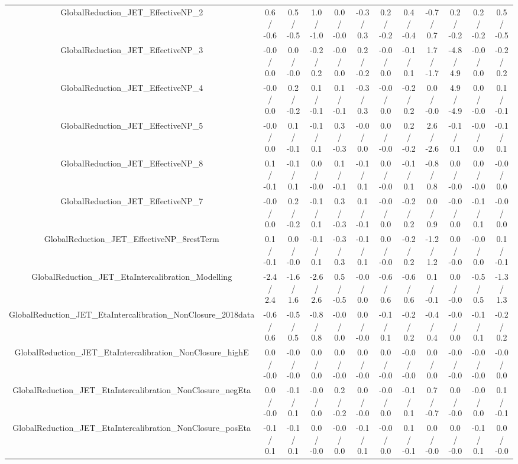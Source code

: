 \begin{table}[htbp]
\begin{center}
\begin{tabular}{|c|c|c|c|c|c|c|c|c|c|c|c|}
  GlobalReduction_JET_EffectiveNP_2 & 0.6 / -0.6 & 0.5 / -0.5 & 1.0 / -1.0 & 0.0 / -0.0 & -0.3 / 0.3 & 0.2 / -0.2 & 0.4 / -0.4 & -0.7 / 0.7 & 0.2 / -0.2 & 0.2 / -0.2 & 0.5 / -0.5 \\ 
  GlobalReduction_JET_EffectiveNP_3 & -0.0 / 0.0 & 0.0 / -0.0 & -0.2 / 0.2 & -0.0 / 0.0 & 0.2 / -0.2 & -0.0 / 0.0 & -0.1 / 0.1 & 1.7 / -1.7 & -4.8 / 4.9 & -0.0 / 0.0 & -0.2 / 0.2 \\ 
  GlobalReduction_JET_EffectiveNP_4 & -0.0 / 0.0 & 0.2 / -0.2 & 0.1 / -0.1 & 0.1 / -0.1 & -0.3 / 0.3 & -0.0 / 0.0 & -0.2 / 0.2 & 0.0 / -0.0 & 4.9 / -4.9 & 0.0 / -0.0 & 0.1 / -0.1 \\ 
  GlobalReduction_JET_EffectiveNP_5 & -0.0 / 0.0 & 0.1 / -0.1 & -0.1 / 0.1 & 0.3 / -0.3 & -0.0 / 0.0 & 0.0 / -0.0 & 0.2 / -0.2 & 2.6 / -2.6 & -0.1 / 0.1 & -0.0 / 0.0 & -0.1 / 0.1 \\ 
  GlobalReduction_JET_EffectiveNP_8 & 0.1 / -0.1 & -0.1 / 0.1 & 0.0 / -0.0 & 0.1 / -0.1 & -0.1 / 0.1 & 0.0 / -0.0 & -0.1 / 0.1 & -0.8 / 0.8 & 0.0 / -0.0 & 0.0 / -0.0 & -0.0 / 0.0 \\ 
  GlobalReduction_JET_EffectiveNP_7 & -0.0 / 0.0 & 0.2 / -0.2 & -0.1 / 0.1 & 0.3 / -0.3 & 0.1 / -0.1 & -0.0 / 0.0 & -0.2 / 0.2 & 0.0 / 0.9 & -0.0 / 0.0 & -0.1 / 0.1 & -0.0 / 0.0 \\ 
  GlobalReduction_JET_EffectiveNP_8restTerm & 0.1 / -0.1 & 0.0 / -0.0 & -0.1 / 0.1 & -0.3 / 0.3 & -0.1 / 0.1 & 0.0 / -0.0 & -0.2 / 0.2 & -1.2 / 1.2 & 0.0 / -0.0 & -0.0 / 0.0 & 0.1 / -0.1 \\ 
  GlobalReduction_JET_EtaIntercalibration_Modelling & -2.4 / 2.4 & -1.6 / 1.6 & -2.6 / 2.6 & 0.5 / -0.5 & -0.0 / 0.0 & -0.6 / 0.6 & -0.6 / 0.6 & 0.1 / -0.1 & 0.0 / -0.0 & -0.5 / 0.5 & -1.3 / 1.3 \\ 
  GlobalReduction_JET_EtaIntercalibration_NonClosure_2018data & -0.6 / 0.6 & -0.5 / 0.5 & -0.8 / 0.8 & -0.0 / 0.0 & 0.0 / -0.0 & -0.1 / 0.1 & -0.2 / 0.2 & -0.4 / 0.4 & -0.0 / 0.0 & -0.1 / 0.1 & -0.2 / 0.2 \\ 
  GlobalReduction_JET_EtaIntercalibration_NonClosure_highE & 0.0 / -0.0 & -0.0 / -0.0 & 0.0 / 0.0 & 0.0 / -0.0 & 0.0 / -0.0 & 0.0 / -0.0 & -0.0 / -0.0 & 0.0 / 0.0 & -0.0 / -0.0 & -0.0 / -0.0 & -0.0 / 0.0 \\ 
  GlobalReduction_JET_EtaIntercalibration_NonClosure_negEta & 0.0 / -0.0 & -0.1 / 0.1 & -0.0 / 0.0 & 0.2 / -0.2 & 0.0 / -0.0 & -0.0 / 0.0 & -0.1 / 0.1 & 0.7 / -0.7 & 0.0 / -0.0 & -0.0 / 0.0 & 0.1 / -0.1 \\ 
  GlobalReduction_JET_EtaIntercalibration_NonClosure_posEta & -0.1 / 0.1 & -0.1 / 0.1 & 0.0 / -0.0 & -0.0 / 0.0 & -0.1 / 0.1 & -0.0 / 0.0 & 0.1 / -0.1 & 0.0 / -0.0 & 0.0 / -0.0 & -0.1 / 0.1 & 0.0 / -0.0 \\ 

\end{tabular}
\end{center}
\end{table}
